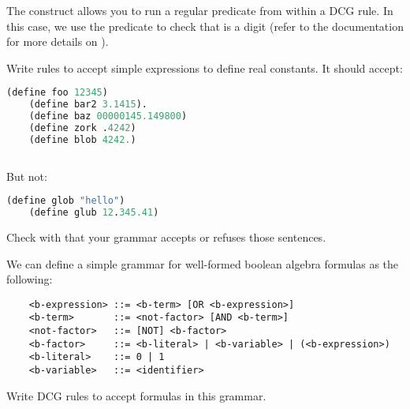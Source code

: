 \documentclass{../../../tp}
\begin{document}
The  construct allows you to run a regular \prolog predicate from within a DCG rule. In this case, we use the  predicate to check that  is a digit (refer to the documentation for more details on ).

\begin{instruction}
	Write rules to accept simple \scheme expressions to define real constants. It should accept:
	
	\begin{lstlisting}[language=lisp]
	(define foo 12345)
	(define bar2 3.1415).
	(define baz 00000145.149800)
	(define zork .4242)
	(define blob 4242.)
	
	\end{lstlisting}
	
	But not: 
	
	\begin{lstlisting}[language=lisp]
	(define glob "hello")
	(define glub 12.345.41)
	\end{lstlisting}
	
	Check with  that your grammar accepts or refuses those sentences.
\end{instruction}  




\begin{instruction}
	We can define a simple grammar for well-formed boolean algebra formulas as the following:
	
	\begin{verbatim}
	<b-expression> ::= <b-term> [OR <b-expression>]
	<b-term>       ::= <not-factor> [AND <b-term>]
	<not-factor>   ::= [NOT] <b-factor>
	<b-factor>     ::= <b-literal> | <b-variable> | (<b-expression>)
	<b-literal>    ::= 0 | 1
	<b-variable>   ::= <identifier>
	\end{verbatim}
	
	Write DCG rules to accept formulas in this grammar. 
\end{instruction}

	
\end{document}
